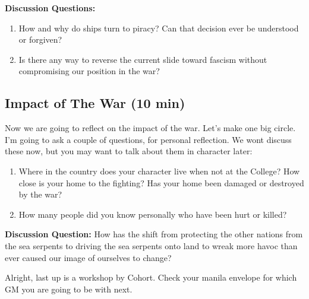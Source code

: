 \documentclass[green]{GL2020}
\begin{document}
\textbf{Discussion Questions:}
\begin{enumerate}
	\item How and why do ships turn to piracy? Can that decision ever be understood or forgiven?
	\item Is there any way to reverse the current slide toward fascism without compromising our position in the war?
\end{enumerate}


\subsection*{Impact of The War (10 min)}
Now we are going to reflect on the impact of the war. Let’s make one big circle. I’m going to ask a couple of questions, for personal reflection. We wont discuss these now, but you may want to talk about them in character later:
\begin{enumerate}
	\item Where in the country does your character live when not at the College? How close is your home to the fighting? Has your home been damaged or destroyed by the war?
	\item How many people did you know personally who have been hurt or killed?
\end{enumerate}

\textbf{Discussion Question:} How has the shift from protecting the other nations from the sea serpents to driving the sea serpents onto land to wreak more havoc than ever caused our image of ourselves to change?


Alright, last up is a workshop by Cohort. Check your manila envelope for which GM you are going to be with next.
\end{document}
